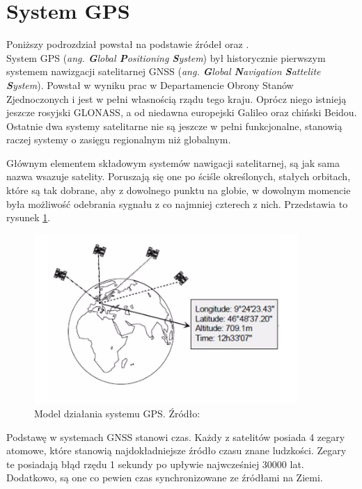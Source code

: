 \section{System GPS}
\label{GPS}

Poniższy podrozdział powstał na podstawie źródeł \cite{GPS_ublox} oraz \cite{inzynierka}.\\



System GPS (\textit{ang. \textbf{G}lobal \textbf{P}ositioning \textbf{S}ystem}) był historycznie pierwszym systemem nawizgacji satelitarnej GNSS (\textit{ang. \textbf{G}lobal \textbf{N}avigation \textbf{S}attelite \textbf{S}ystem}). Powstał w wyniku prac w Departamencie Obrony Stanów Zjednoczonych i jest w pełni własnością rządu tego kraju. Oprócz niego istnieją jeszcze rosyjski GLONASS, a od niedawna europejski Galileo oraz chiński Beidou. Ostatnie dwa systemy satelitarne nie są jeszcze w pełni funkcjonalne, stanowią raczej systemy o zasięgu regionalnym niż globalnym.

Głównym elementem składowym systemów nawigacji satelitarnej, są jak sama nazwa wsazuje satelity. Poruszają się one po ściśle określonych, stałych orbitach, które są tak dobrane, aby z dowolnego punktu na globie, w dowolnym momencie była możliwość odebrania sygnału z co najmniej czterech z nich. Przedstawia to rysunek \ref{fig:image_gps_basics}.

\begin{figure}[H]
	\centering
	\includegraphics[width=10cm]{img/theory/GPS/gps_introduction.png}
	\caption{Model działania systemu GPS. Źródło: \cite{GPS_ublox}}
	\label{fig:image_gps_basics}
\end{figure}

Podstawę w systemach GNSS stanowi czas. Każdy z satelitów posiada 4 zegary atomowe, które stanowią najdokładniejsze źródło czasu znane ludzkości. Zegary te posiadają błąd rzędu 1 sekundy po upływie najwcześniej 30000 lat. Dodatkowo, są one co pewien czas synchronizowane ze źródłami na Ziemi.

